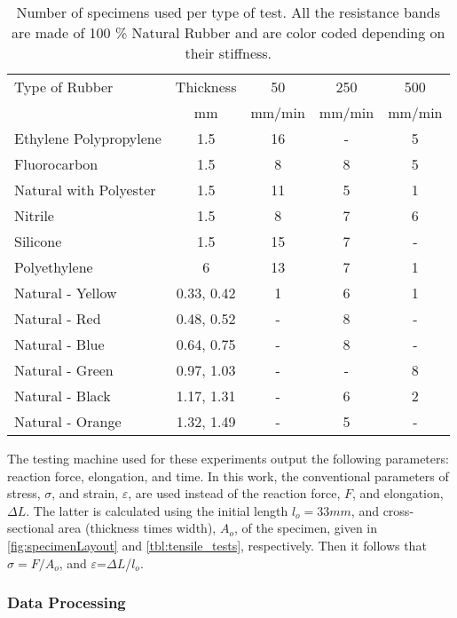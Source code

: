 \begin{table}[htb!]
    \centering
    \caption{Number of specimens used per type of test. All the resistance bands are made of 100 \% Natural Rubber and are color coded depending on their stiffness.}
    \begin{tabular}{lcccc}
    \toprule
    Type of Rubber & Thickness &  50 & 250 & 500\\
     & mm & mm/min & mm/min & mm/min \\
    \hline
    Ethylene Polypropylene   &  1.5 & 16 & - & 5\\
    Fluorocarbon              &  1.5 & 8 & 8 & 5\\
    Natural with Polyester   &  1.5 & 11 & 5 & 1\\
    Nitrile                   &  1.5 & 8 & 7 & 6\\
    Silicone                  &  1.5 & 15 & 7 & -\\
    Polyethylene              &  6 & 13 & 7 & 1\\
    \hline
    Natural - Yellow  & 0.33, 0.42 & 1 & 6 & 1\\
    Natural - Red  & 0.48, 0.52 & - & 8 & -\\
    Natural - Blue  & 0.64, 0.75 & - & 8 & -\\
    Natural - Green  & 0.97, 1.03 & - & - & 8\\
    Natural - Black  & 1.17, 1.31 & - & 6 & 2\\
    Natural - Orange  & 1.32, 1.49 & - & 5 & -\\
    \bottomrule
    \end{tabular}
    \label{tbl:tensile_tests}
\end{table}

The testing machine used for these experiments output the following parameters: reaction force, elongation, and time. In this work, the conventional parameters of stress, $\sigma$, and strain, $\varepsilon$, are used instead of the reaction force, $F$, and elongation, $\Delta L$. The latter is calculated using the initial length $l_o=33 mm$, and cross-sectional area (thickness times width), $A_o$, of the specimen, given in \autoref{fig:specimenLayout} and \autoref{tbl:tensile_tests}, respectively. Then it follows that $\sigma=F/A_o$, and $\varepsilon$=$\Delta L$/$l_o$.

\subsubsection{Data Processing} \label{sss:dataProcessing                                                                                                                                                                                                                                                                                                                                                                                                                                                                                                                          }

